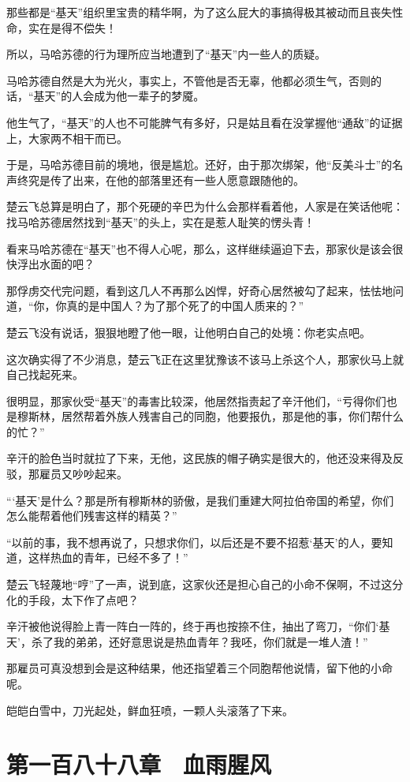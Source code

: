 那些都是“基天”组织里宝贵的精华啊，为了这么屁大的事搞得极其被动而且丧失性命，实在是得不偿失！

所以，马哈苏德的行为理所应当地遭到了“基天”内一些人的质疑。

马哈苏德自然是大为光火，事实上，不管他是否无辜，他都必须生气，否则的话，“基天”的人会成为他一辈子的梦魇。

他生气了，“基天”的人也不可能脾气有多好，只是姑且看在没掌握他“通敌”的证据上，大家两不相干而已。

于是，马哈苏德目前的境地，很是尴尬。还好，由于那次绑架，他“反美斗士”的名声终究是传了出来，在他的部落里还有一些人愿意跟随他的。

楚云飞总算是明白了，那个死硬的辛巴为什么会那样看着他，人家是在笑话他呢：找马哈苏德居然找到“基天”的头上，实在是惹人耻笑的愣头青！

看来马哈苏德在“基天”也不得人心呢，那么，这样继续逼迫下去，那家伙是该会很快浮出水面的吧？

那俘虏交代完问题，看到这几人不再那么凶悍，好奇心居然被勾了起来，怯怯地问道，“你，你真的是中国人？为了那个死了的中国人质来的？”

楚云飞没有说话，狠狠地瞪了他一眼，让他明白自己的处境：你老实点吧。

这次确实得了不少消息，楚云飞正在这里犹豫该不该马上杀这个人，那家伙马上就自己找起死来。

很明显，那家伙受“基天”的毒害比较深，他居然指责起了辛汗他们，“亏得你们也是穆斯林，居然帮着外族人残害自己的同胞，他要报仇，那是他的事，你们帮什么的忙？”

辛汗的脸色当时就拉了下来，无他，这民族的帽子确实是很大的，他还没来得及反驳，那雇员又吵吵起来。

“‘基天’是什么？那是所有穆斯林的骄傲，是我们重建大阿拉伯帝国的希望，你们怎么能帮着他们残害这样的精英？”

“以前的事，我不想再说了，只想求你们，以后还是不要不招惹‘基天’的人，要知道，这样热血的青年，已经不多了！”

楚云飞轻蔑地“哼”了一声，说到底，这家伙还是担心自己的小命不保啊，不过这分化的手段，太下作了点吧？

辛汗被他说得脸上青一阵白一阵的，终于再也按捺不住，抽出了弯刀，“你们‘基天’，杀了我的弟弟，还好意思说是热血青年？我呸，你们就是一堆人渣！”

那雇员可真没想到会是这种结果，他还指望着三个同胞帮他说情，留下他的小命呢。

皑皑白雪中，刀光起处，鲜血狂喷，一颗人头滚落了下来。

\section{第一百八十八章　血雨腥风}

